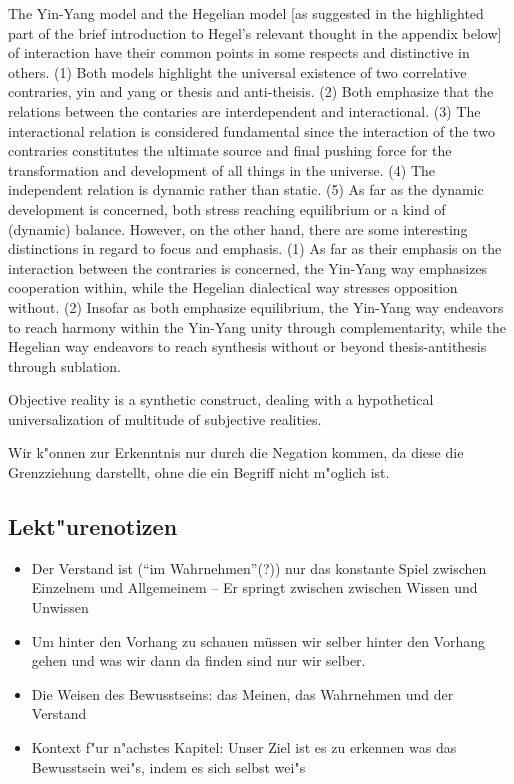 \documentclass[emulatestandardclasses]{scrartcl}
\begin{document}
The Yin-Yang model and the Hegelian model [as suggested in the highlighted part of the brief introduction to Hegel’s relevant thought in the appendix below] of interaction have their common points in some respects and distinctive in others. (1) Both models highlight the universal existence of two correlative contraries, yin and yang or thesis and anti-theisis. (2) Both emphasize that the relations  between the contaries are interdependent and interactional. (3) The interactional relation is considered fundamental since the interaction of the two contraries constitutes the ultimate source and final pushing force for the transformation and development of all things in the universe. (4) The independent relation is dynamic rather than static. (5) As far as the dynamic development is concerned, both stress reaching equilibrium or a kind of (dynamic) balance. However, on the other hand, there are some interesting distinctions in regard to focus and emphasis. (1) As far as their emphasis on the interaction between the contraries is concerned, the Yin-Yang way emphasizes cooperation within, while the Hegelian dialectical way stresses opposition without. (2) Insofar as both emphasize equilibrium, the Yin-Yang way endeavors to reach harmony within the Yin-Yang unity through complementarity, while the Hegelian way endeavors to reach synthesis without or beyond thesis-antithesis through sublation. 
 
Objective reality is a synthetic construct, dealing with a hypothetical universalization of multitude of subjective realities. 
 
Wir k"onnen zur Erkenntnis nur durch die Negation kommen, da diese die Grenzziehung darstellt, ohne die ein Begriff nicht m"oglich ist.


\subsection{Lekt"urenotizen}

\begin{itemize}
  \item Der Verstand ist ("`im Wahrnehmen"'(?)) nur das konstante Spiel zwischen Einzelnem und Allgemeinem -- Er springt zwischen zwischen Wissen und Unwissen 
  \item Um hinter den Vorhang zu schauen müssen wir selber hinter den Vorhang gehen und was wir dann da finden sind nur wir selber.
  \item Die Weisen des Bewusstseins: das Meinen, das Wahrnehmen und der Verstand
  \item Kontext f"ur n"achstes Kapitel: Unser Ziel ist es zu erkennen was das Bewusstsein wei"s, indem es sich selbst wei"s 
\end{itemize}
\end{document}
